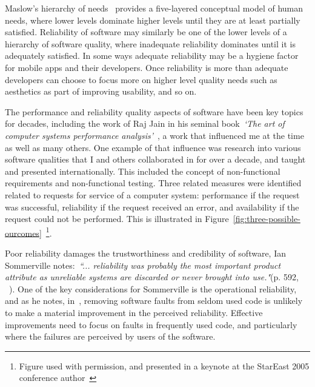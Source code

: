 Maslow's hierarchy of needs~\citep{wikipedia_maslows_hierarchy_of_needs} provides a five-layered conceptual model of human needs, where lower levels dominate higher levels until they are at least partially satisfied. Reliability of software may similarly be one of the lower levels of a hierarchy of software quality, where inadequate reliability dominates until it is adequately satisfied. In some ways adequate reliability may be a hygiene factor for mobile apps and their developers. Once reliability is more than adequate developers can choose to focus more on higher level quality needs such as aesthetics as part of improving usability, and so on.

The performance and reliability quality aspects of software have been key topics for decades, including the work of Raj Jain in his seminal book~\emph{`The art of computer systems performance analysis'}~\cite{jain1991art}, a work that influenced me at the time as well as many others. One example of that influence was research into various software qualities that I and others collaborated in for over a decade, and taught and presented internationally. This included the concept of non-functional requirements and non-functional testing. Three related measures were identified related to requests for service of a computer system: performance if the request was successful, reliability if the request received an error, and availability if the request could not be performed. This is illustrated in Figure~\ref{fig:three-possible-ourcomes}~\footnote{Figure used with permission, and presented in a keynote at the StarEast 2005 conference author~\cite{harty_stareast2005_keynote}}. 

Poor reliability damages the trustworthiness and credibility of software, Ian Sommerville notes:~\emph{``... reliability was probably the most important product attribute as unreliable systems are discarded or never brought into use."}(p. 592, ~\cite{sommerville1989_software_engineering}). One of the key considerations for Sommerville is the operational reliability, and as he notes, in~\cite{mills1987_cleanroom_software_engineering}, removing software faults from seldom used code is unlikely to make a material improvement in the perceived reliability. Effective improvements need to focus on faults in frequently used code, and particularly where the failures are perceived by users of the software.

